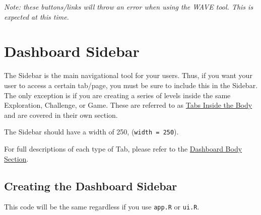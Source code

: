 \documentclass[
]{book}
\begin{document}
\emph{Note: these buttons/links will throw an error when using the WAVE tool. This is expected at this time.}

\hypertarget{sidebarb}{%
\section{Dashboard Sidebar}\label{sidebarb}}

The Sidebar is the main navigational tool for your users. Thus, if you want your user to access a certain tab/page, you must be sure to include this in the Sidebar. The only exception is if you are creating a series of levels inside the same Exploration, Challenge, or Game. These are referred to as \protect\hyperlink{innerTabs}{Tabs Inside the Body} and are covered in their own section.

The Sidebar should have a width of 250, (\texttt{width\ =\ 250}).

For full descriptions of each type of Tab, please refer to the \protect\hyperlink{body}{Dashboard Body Section}.

\hypertarget{creating-the-dashboard-sidebar-1}{%
\subsection{Creating the Dashboard Sidebar}\label{creating-the-dashboard-sidebar-1}}

This code will be the same regardless if you use \texttt{app.R} or \texttt{ui.R}.
\end{document}
